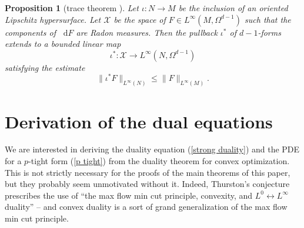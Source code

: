 \documentclass[reqno,11pt]{amsart}
\newcommand{\RR}{\mathbf{R}}
\newcommand*\dif{\mathop{}\!\mathrm{d}}
\newcommand{\Mass}{\mathbf M}
\newcommand{\dfn}[1]{\emph{#1}\index{#1}}
\newcommand{\loc}{\mathrm{loc}}
\newcommand{\cpt}{\mathrm{cpt}}
\newtheorem{proposition}[theorem]{Proposition}
\theoremstyle{definition}
\numberwithin{equation}{section}
\begin{document}
\begin{proposition}[trace theorem {\cite[Theorem 1.2]{Anzellotti1983}}]\label{integration is welldefined}
Let $\iota: N \to M$ be the inclusion of an oriented Lipschitz hypersurface.
Let $\mathcal X$ be the space of $F \in L^\infty(M, \Omega^{d - 1})$ such that the components of $\dif F$ are Radon measures.
Then the pullback $\iota^*$ of $d - 1$-forms extends to a bounded linear map
$$\iota^*: \mathcal X \to L^\infty(N, \Omega^{d - 1})$$
satisfying the estimate
\begin{equation}\label{integral over chain is linfinity}
	\|\iota^* F\|_{L^\infty(N)} \leq \|F\|_{L^\infty(M)}.
\end{equation}
\end{proposition}




\section{Derivation of the dual equations}\label{duality derivation}
We are interested in deriving the duality equation (\ref{strong duality}) and the PDE for a $p$-tight form (\ref{p tight}) from the duality theorem for convex optimization.
This is not strictly necessary for the proofs of the main theorems of this paper, but they probably seem unmotivated without it.
Indeed, Thurston's conjecture prescribes the use of ``the max flow min cut principle, convexity, and $L^0 \leftrightarrow L^\infty$ duality'' -- and convex duality is a sort of grand generalization of the max flow min cut principle.
\end{document}
